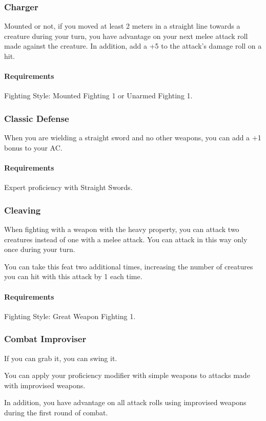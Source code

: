 \subsubsection{Charger} \label{feat::charger}
    Mounted or not, if you moved at least 2 meters in a straight line towards a creature during your turn, you have advantage on your next melee attack roll made against the creature.
    In addition, add a +5 to the attack's damage roll on a hit.
    \paragraph{Requirements} Fighting Style: Mounted Fighting 1 or Unarmed Fighting 1.
\subsubsection{Classic Defense} \label{feat::classicdefense}
    When you are wielding a straight sword and no other weapons, you can add a +1 bonus to your AC.
    \paragraph{Requirements} Expert proficiency with Straight Swords.
\subsubsection{Cleaving} \label{feat::cleaving}
    When fighting with a weapon with the heavy property, you can attack two creatures instead of one with a melee attack.
    You can attack in this way only once during your turn.

    You can take this feat two additional times, increasing the number of creatures you can hit with this attack by 1 each time.
    \paragraph{Requirements} Fighting Style: Great Weapon Fighting 1.
\subsubsection{Combat Improviser} \label{feat::combatimproviser}
    If you can grab it, you can swing it.

    You can apply your proficiency modifier with simple weapons to attacks made with improvised weapons.

    In addition, you have advantage on all attack rolls using improvised weapons during the first round of combat.
